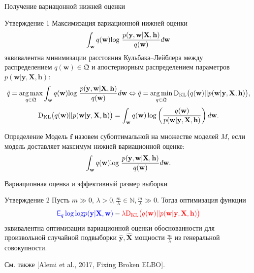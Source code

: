 \documentclass[usenames,dvipsnames,10pt,pdf,utf8,russian,aspectratio=43]{beamer}
\DeclareMathOperator*{\argmax}{arg\,max}
\DeclareMathOperator*{\argmin}{arg\,min}
\begin{document}
\begin{frame}{Получение вариацонной нижней оценки}
\small
\begin{block}{Утверждение 1} Максимизация вариационной нижней оценки $$\int_{\mathbf{w}} q(\mathbf{w})\textnormal{log}~\frac{p(\mathbf{y},\mathbf{w}|\mathbf{X},\mathbf{h})}{q(\mathbf{w})}d\mathbf{w}$$   эквивалентна минимизации расстояния Кульбака--Лейблера между распределением $q(\mathbf{w}) \in \mathfrak{Q}$ и апостериорным распределением параметров $p(\mathbf{w}|\mathbf{y}, \mathbf{X}, \mathbf{h})$:
\[
    \hat{q} = \argmax_{q \in \mathfrak{Q}} \int_{\mathbf{w}} q(\mathbf{w})\textnormal{log}~\frac{p(\mathbf{y},\mathbf{w}|\mathbf{X},\mathbf{h})}{q(\mathbf{w})}d\mathbf{w} \Leftrightarrow 	
    \hat{q} = \argmin_{q \in  \mathfrak{Q}} \textnormal{D}_\textnormal{KL}  \bigl(q(\mathbf{w})||p(\mathbf{w}|\mathbf{y}, \mathbf{X}, \mathbf{h})\bigr),
\]
\[
	\textnormal{D}_\textnormal{KL}  \bigl(q(\mathbf{w})||p(\mathbf{w}|\mathbf{y}, \mathbf{X}, \mathbf{h})\bigr) =  \int_\mathbf{w} q(\mathbf{w}) \log \left(\frac{q(\mathbf{w})}{p(\mathbf{w}|\mathbf{y}, \mathbf{X}, \mathbf{h})}\right) d\mathbf{w}.
\]

\end{block}


\begin{block}{Определение} Модель $\mathbf{f}$ назовем субоптимальной на множестве моделей $M$, если модель доставляет максимум нижней вариационной оценке:
\[
 \int_{\mathbf{w}} q(\mathbf{w})\textnormal{log}~\frac{p(\mathbf{y},\mathbf{w}|\mathbf{X},{\mathbf{h})}}{q(\mathbf{w})}d\mathbf{w}.
\]
\end{block}


\end{frame}

\begin{frame}{Вариационная оценка и эффективный размер выборки}
\begin{block}{Утверждение 2}
Пусть $m \gg 0$, $\lambda > 0, \frac{m}{\lambda}   \in \mathbb{N}, \frac{m}{\lambda}  \gg 0.$ Тогда оптимизация функции
\[
\textcolor{blue}{\mathsf{E}_{q} \log \text{log} p(\mathbf{y}|\mathbf{X}, \mathbf{w})} - \textcolor{red}{\lambda \textnormal{D}_\textnormal{KL}  \bigl(q(\mathbf{w})||p(\mathbf{w}|\mathbf{y}, \mathbf{X}, \mathbf{h})\bigr)}
\]
 эквивалентна оптимизации вариационной оценки обоснованности  
для произвольной случайной подвыборки $\hat{\mathbf{y}}, \hat{\mathbf{X}}$ мощности $\frac{m}{{\lambda}}$ из генеральной совокупности.
\end{block}

См. также [Alemi et al., 2017, Fixing Broken ELBO].
\end{frame}
\end{document}
